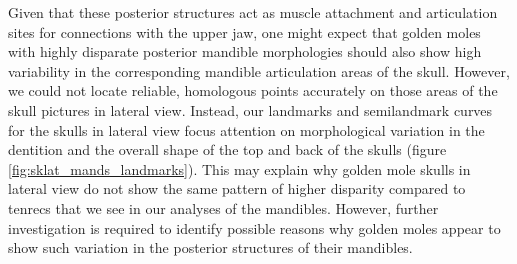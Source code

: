 \documentclass[12pt,a4paper]{article}
\begin{document}
			
	 Given that these posterior structures act as muscle attachment and articulation sites for connections with the upper jaw, %
	 one might expect that golden moles with highly disparate posterior mandible morphologies should also show high variability in the corresponding mandible articulation areas of the skull. However, we could not locate reliable, homologous points accurately on those areas of the skull pictures in lateral view. Instead, our landmarks and semilandmark curves for the skulls in lateral view focus attention on morphological variation in the dentition and the overall shape of the top and back of the skulls (figure \ref{fig:sklat_mands_landmarks}). This may explain why golden mole skulls in lateral view do not show the same pattern of higher disparity compared to tenrecs that we see in our analyses of the mandibles. However, further investigation is required to identify possible reasons why golden moles appear to show such variation in the posterior structures of their mandibles.
	 	
	
	
	
	
\end{document}
